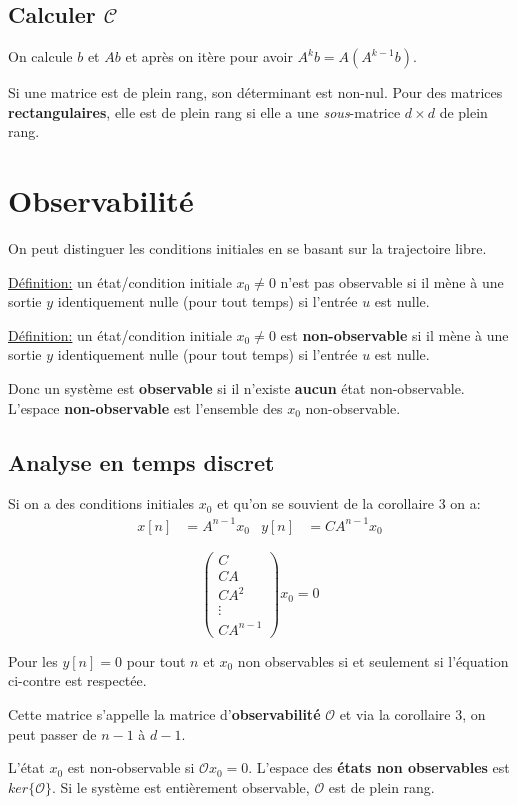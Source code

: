 \documentclass{report}
\begin{document}
\subsection{Calculer $\mathcal{C}$}
On calcule $b$ et $Ab$ et après on itère pour avoir $A^k b = A(A^{k-1} b)$.\par \noindent
Si une matrice est de plein rang, son déterminant est non-nul. Pour des matrices \textbf{rectangulaires}, elle est de plein rang si elle a une \textit{sous}-matrice $d \times d$ de plein rang.

\section{Observabilité}
On peut distinguer les conditions initiales en se basant sur la trajectoire libre.\par \noindent
\underline{Définition:} un état/condition initiale $x_0 \neq 0$ n'est pas observable si il mène à une sortie $y$ identiquement nulle (pour tout temps) si l'entrée $u$ est nulle.\par \noindent
\underline{Définition:} un état/condition initiale $x_0 \neq 0$ est \textbf{non-observable} si il mène à une sortie $y$ identiquement nulle (pour tout temps) si l'entrée $u$ est nulle.\par \noindent
Donc un système est \textbf{observable} si il n'existe \textbf{aucun} état non-observable. L'espace \textbf{non-observable} est l'ensemble des $x_0$ non-observable.

\subsection{Analyse en temps discret}
Si on a des conditions initiales $x_0$ et qu'on se souvient de la corollaire 3 on a:
\begin{align*}
x[n] &= A^{n-1} x_0 & y[n] &= C A^{n-1} x_0
\end{align*}
\begin{figure}
\centering
\begin{equation}
\begin{pmatrix}
C\\
CA\\
CA^2\\
\vdots\\
CA^{n-1}
\end{pmatrix} x_0 = 0
\end{equation}
\end{figure}
Pour les $y[n] = 0$ pour tout $n$ et $x_0$ non observables si et seulement si l'équation ci-contre est respectée.\par 
Cette matrice s'appelle la matrice d'\textbf{observabilité} $\mathcal{O}$ et via la corollaire 3, on peut passer de $n-1$ à $d-1$.\par 
L'état $x_0$ est non-observable si $\mathcal{O}x_0 = 0$. L'espace des \textbf{états non observables} est $ker \{\mathcal{O}\}$. Si le système est entièrement observable, $\mathcal{O}$ est de plein rang.
\end{document}
